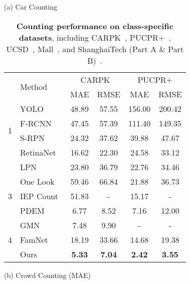 \documentclass[10pt,twocolumn,letterpaper]{article}
\begin{document}
\iffalse
\begin{table}[t]
\setlength\tabcolsep{2pt}
\caption{
    \textbf{Counting performance on class-specific datasets}, including CARPK~\cite{lpn}, PUCPR+~\cite{lpn}, UCSD~\cite{ucsd}, Mall~\cite{mall}, and ShanghaiTech (Part A \& Part B)~\cite{mcnn}. 
}
\begin{minipage}[t]{0.48\textwidth}
\centering
\scriptsize
(a) Car Counting \\
\begin{threeparttable}
\begin{tabular}{clcccc}
\toprule
\multirow{2}{*}{} & \multirow{2}{*}{Method} & 
\multicolumn{2}{c}{CARPK} & \multicolumn{2}{c}{PUCPR+} \\
\cmidrule{3-6}
& & MAE & RMSE & MAE & RMSE \\
\midrule
\multirow{4}{*}{1} 
& YOLO~\cite{yolo}                 & 48.89 & 57.55 & 156.00 & 200.42 \\
& F-RCNN~\cite{faster_rcnn}        & 47.45 & 57.39 & 111.40 & 149.35 \\
& S-RPN~\cite{lpn}                 & 24.32 & 37.62 & 39.88 & 47.67 \\
& RetinaNet~\cite{retinanet}       & 16.62 & 22.30 & 24.58 & 33.12 \\
& LPN~\cite{lpn}                   & 23.80 & 36.79 & 22.76 & 34.46 \\
   \cmidrule{1-6}
\multirow{3}{*}{3}
& One Look~\cite{one_look}        & 59.46 & 66.84 & 21.88 & 36.73 \\
& IEP Count~\cite{iep_counting}   & 51.83 &   -   & 15.17 &   -   \\
& PDEM~\cite{pdem}                & 6.77  & 8.52  & 7.16  & 12.00 \\
   \cmidrule{1-6}
\multirow{3}{*}{4} 
& GMN~\cite{gmn}                   & 7.48  & 9.90  &   -   &   -   \\
& FamNet~\cite{famnet}             & 18.19 & 33.66 & 14.68\tnote{\dag} & 19.38\tnote{\dag} \\
    \cmidrule{2-6}
& Ours & \textbf{5.33}  & \textbf{7.04} & \textbf{2.42} & \textbf{3.55} \\
\bottomrule
\end{tabular}
\end{threeparttable}
\end{minipage}
\hfill
\begin{minipage}[t]{0.48\textwidth}
\centering
\scriptsize
(b) Crowd Counting (MAE) \\
\begin{threeparttable}

\end{threeparttable}
\end{minipage}
\end{table}
\end{document}
